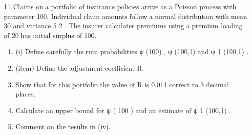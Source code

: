 \documentclass[a4paper,12pt]{article}
\begin{document}
\begin{enumerate}
11
Claims on a portfolio of insurance policies arrive as a Poisson process with parameter
100. Individual claim amounts follow a normal distribution with mean 30 and
variance 5 2 . The insurer calculates premiums using a premium loading of 20%
has initial surplus of 100.
\begin{enumerate}
\item (i) Define carefully the ruin probabilities ψ (100) , ψ (100,1) and ψ 1 (100,1) .

\item (item) Define the adjustment coefficient R.

\item  Show that for this portfolio the value of R is 0.011 correct to 3 decimal places.

\item  Calculate an upper bound for ψ ( 100 ) and an estimate of ψ 1 (100,1) .
\item Comment on the results in (iv).
\end{enumerate}


\end{enumerate}
\end{document}
